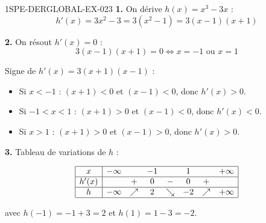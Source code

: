 \begin{corrige}{1SPE-DERGLOBAL-EX-023}
\textbf{1.} On dérive $h(x) = x^3 - 3x$ :
\[
h'(x) = 3x^2 - 3 = 3(x^2 - 1) = 3(x-1)(x+1)
\]

\textbf{2.} On résout $h'(x) = 0$ :
\[
3(x-1)(x+1) = 0 \iff x = -1 \text{ ou } x = 1
\]

Signe de $h'(x) = 3(x+1)(x-1)$ :
\begin{itemize}
\item Si $x < -1$ : $(x+1) < 0$ et $(x-1) < 0$, donc $h'(x) > 0$.
\item Si $-1 < x < 1$ : $(x+1) > 0$ et $(x-1) < 0$, donc $h'(x) < 0$.
\item Si $x > 1$ : $(x+1) > 0$ et $(x-1) > 0$, donc $h'(x) > 0$.
\end{itemize}

\textbf{3.} Tableau de variations de $h$ :

\[
\begin{array}{|c|ccccccc|}
\hline
x & -\infty & & -1 & & 1 & & +\infty \\
\hline
h'(x) & & + & 0 & - & 0 & + & \\
\hline
h & -\infty & \nearrow & 2 & \searrow & -2 & \nearrow & +\infty \\
\hline
\end{array}
\]

avec $h(-1) = -1 + 3 = 2$ et $h(1) = 1 - 3 = -2$.
\end{corrige}
